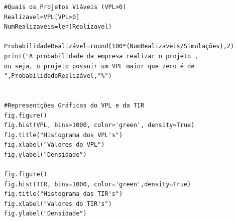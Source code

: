 \documentclass[a4paper,12pt]{article}[abntex2]
\begin{document}
\begin{verbatim}
#Quais os Projetos Viáveis (VPL>0)
Realizavel=VPL[VPL>0]
NumRealizaveis=len(Realizavel)

ProbabilidadeRealizável=round(100*(NumRealizaveis/Simulações),2)
print("A probabilidade da empresa realizar o projeto ,
ou seja, o projeto possuir um VPL maior que zero é de  ",ProbabilidadeRealizável,"%")


#Representções Gráficas do VPL e da TIR
fig.figure()
fig.hist(VPL, bins=1000, color='green', density=True)
fig.title("Histograma dos VPL's")
fig.xlabel("Valores do VPL")
fig.ylabel("Densidade")

fig.figure()
fig.hist(TIR, bins=1000, color='green',density=True)
fig.title("Histograma das TIR's")
fig.xlabel("Valores do TIR's")
fig.ylabel("Densidade")
\end{verbatim}
\end{document}
